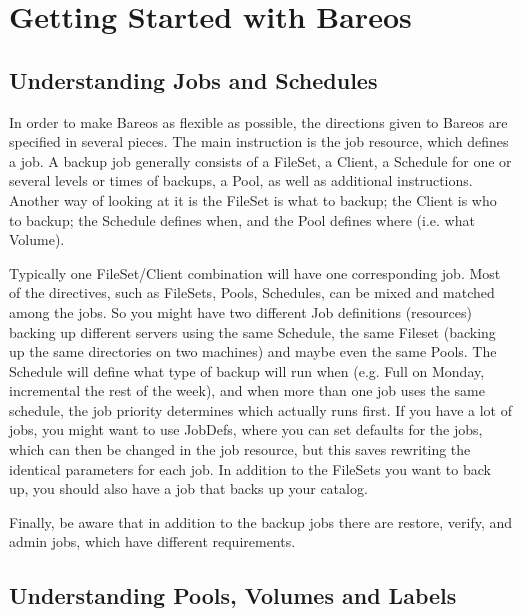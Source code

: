 \chapter{Getting Started with Bareos}
\label{QuickStartChapter}

\section{Understanding Jobs and Schedules}
\label{JobsandSchedules}

In order to make Bareos as flexible as possible, the directions given
to Bareos are specified in several pieces.  The main instruction is the
job resource, which defines a job.  A backup job generally consists of a
FileSet, a Client, a Schedule for one or several levels or times of backups,
a Pool, as well as additional instructions. Another way of looking
at it is the FileSet is what to backup; the Client is who to backup; the
Schedule defines when, and the Pool defines where (i.e. what Volume).

Typically one FileSet/Client combination will have one corresponding job.
Most of the directives, such as FileSets, Pools, Schedules, can be mixed
and matched among the jobs.  So you might have two different Job
definitions (resources) backing up different servers using the same
Schedule, the same Fileset (backing up the same directories on two machines)
and maybe even the same Pools.  The Schedule will define what type of
backup will run when (e.g. Full on Monday, incremental the rest of the
week), and when more than one job uses the same schedule, the job priority
determines which actually runs first.  If you have a lot of jobs, you might
want to use JobDefs, where you can set defaults for the jobs, which can
then be changed in the job resource, but this saves rewriting the
identical parameters for each job.  In addition to the FileSets you want to
back up, you should also have a job that backs up your catalog.

Finally, be aware that in addition to the backup jobs there are
restore, verify, and admin jobs, which have different requirements.

\section{Understanding Pools, Volumes and Labels}
\label{PoolsVolsLabels}


